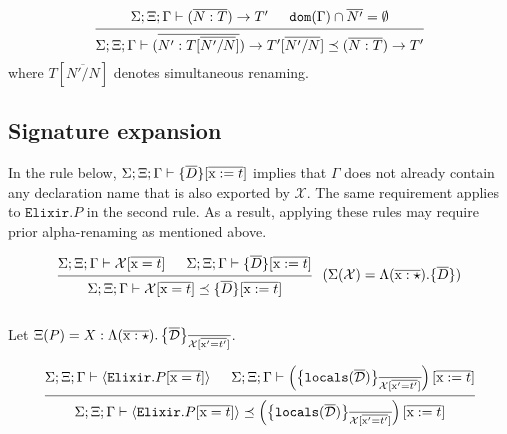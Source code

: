 \documentclass[12pt]{article}
\newcommand{\tx}{\text{\rm x}}
\newcommand{\BX}{\ensuremath{\mathcal{X}}}
\newcommand{\Gammatop}{\ensuremath{\Xi}}
\newcommand{\Gammabot}{\ensuremath{\Gamma}}
\newcommand{\dom}{\texttt{dom}}
\newcommand{\locals}{\texttt{locals}}
\newcommand{\Elixir}{\texttt{Elixir}}
\begin{document}
\[
    \begin{prooftree}
        \hypo { \Sigma; \Gammatop; \Gammabot \vdash (\overline{N : T}) \rightarrow T' }
        \hypo { \dom(\Gammabot) \cap \overline{N'} = \emptyset }
        \infer2{ \Sigma; \Gammatop; \Gammabot \vdash (\overline{N' : T[\overline{N'/N}]}) \rightarrow T'[\overline{N'/N}] \preceq (\overline{N : T}) \rightarrow T' }
    \end{prooftree}
\]
where $T[\overline{N'/N}]$ denotes simultaneous renaming. \\

\subsection{Signature expansion}

In the rule below, $\Sigma; \Gammatop; \Gammabot  \vdash \{ \overline{D} \}[\overline{\tx := t}]$
implies that $\Gammabot$ does not already contain any declaration name that is also exported by $\BX$.
The same requirement applies to $\Elixir.P$ in the second rule.
As a result, applying these rules may require prior alpha-renaming as mentioned above.

\[
    \begin{prooftree}
        \hypo{ \Sigma; \Gammatop; \Gammabot \vdash \BX[\overline{\tx = t}]}
        \hypo{ \Sigma; \Gammatop; \Gammabot \vdash \{ \overline{D} \}[\overline{\tx := t}]}
        \infer2[\;($\Sigma(\BX) = \Lambda (\overline{\tx : \star}). \{\overline{D} \}$)]{ \Sigma; \Gammatop; \Gammabot \vdash \BX[\overline{\tx = t}] \preceq \{ \overline{D} \}[\overline{\tx := t}]}
    \end{prooftree}
\] \\

Let $\Gammatop(P) = X : \Moddecl[\tx] [\overline{\mathcal{D}}][\BX][\tx'][t']$.

\[
    \begin{prooftree}
        \hypo { \Sigma; \Gammatop; \Gammabot  \vdash \langle \Elixir.P[\overline{\tx = t}] \rangle}
        \hypo { \Sigma; \Gammatop; \Gammabot  \vdash  \left(\left\{ \locals(\overline{\mathcal{D}}) \right\}_{\overline{\BX[\overline{\tx' = t'}]}}\right)[\overline{\tx := t}] }
        \infer2{ \Sigma; \Gammatop; \Gammabot \vdash \langle \Elixir.P[\overline{\tx = t}] \rangle \preceq \left(\left\{ \locals(\overline{\mathcal{D}}) \right\}_{\overline{\BX[\overline{\tx' = t'}]}}\right)[\overline{\tx := t}]}
    \end{prooftree}
\] \\
\end{document}
